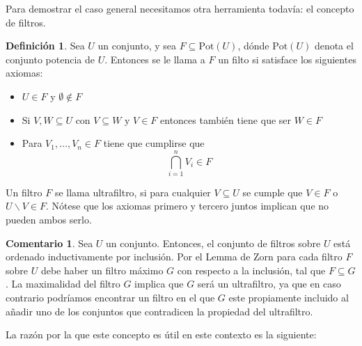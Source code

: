 \documentclass[12pt,a4paper,BCOR15mm,twoside,DIV12]{article}
\theoremstyle{definition}
\newtheorem{rem}[Satz]{Comentario}
\newtheorem{defn}[Satz]{Definición}
\begin{document}
Para demostrar el caso general necesitamos otra herramienta todavía: el concepto de filtros.

\begin{defn}
Sea $U$ un conjunto, y sea $F \subseteq \text{Pot}(U)$, dónde $\text{Pot}(U)$ denota el conjunto potencia de $U$. Entonces se le llama a $F$ un filto si satisface los siguientes axiomas:
\begin{itemize}
\item  $U \in F$ y $\emptyset \notin F$
\item Si $V,W \subseteq U$ con $V \subseteq W \text{ y }V  \in F $ entonces también tiene que ser $W \in F$
\item Para $V_1, \ldots, V_n \in F$ tiene que cumplirse que \[ \bigcap_{i = 1}^n V_i \in F \]
\end{itemize}
Un filtro $F$ se llama ultrafiltro, si para cualquier $V \subseteq U$ se cumple que $V \in F$ o $U \backslash V \in F$. Nótese que los axiomas primero y tercero juntos implican que no pueden ambos serlo.
\end{defn}

\begin{rem}
Sea $U$ un conjunto. Entonces, el conjunto de filtros sobre $U$ está ordenado inductivamente por inclusión. Por el Lemma de Zorn para cada filtro $F$ sobre $U$ debe haber un filtro máximo $G$ con respecto a la inclusión, tal que $F \subseteq G$.
La maximalidad del filtro $G$ implica que $G$ será un ultrafiltro, ya que en caso contrario podríamos encontrar un filtro en el que $G$ este propiamente incluido al añadir uno de los conjuntos que contradicen la propiedad del ultrafiltro.
\end{rem}

La razón por la que este concepto es útil en este contexto es la siguiente:
\end{document}
